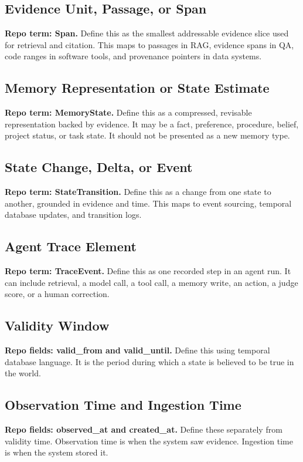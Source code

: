 \documentclass[11pt]{article}
\begin{document}
\subsection{Evidence Unit, Passage, or Span}
\textbf{Repo term: Span.} Define this as the smallest addressable evidence slice used for retrieval and citation. This maps to passages in RAG, evidence spans in QA, code ranges in software tools, and provenance pointers in data systems.

\subsection{Memory Representation or State Estimate}
\textbf{Repo term: MemoryState.} Define this as a compressed, revisable representation backed by evidence. It may be a fact, preference, procedure, belief, project status, or task state. It should not be presented as a new memory type.

\subsection{State Change, Delta, or Event}
\textbf{Repo term: StateTransition.} Define this as a change from one state to another, grounded in evidence and time. This maps to event sourcing, temporal database updates, and transition logs.

\subsection{Agent Trace Element}
\textbf{Repo term: TraceEvent.} Define this as one recorded step in an agent run. It can include retrieval, a model call, a tool call, a memory write, an action, a judge score, or a human correction.

\subsection{Validity Window}
\textbf{Repo fields: valid\_from and valid\_until.} Define this using temporal database language. It is the period during which a state is believed to be true in the world.

\subsection{Observation Time and Ingestion Time}
\textbf{Repo fields: observed\_at and created\_at.} Define these separately from validity time. Observation time is when the system saw evidence. Ingestion time is when the system stored it.
\end{document}
